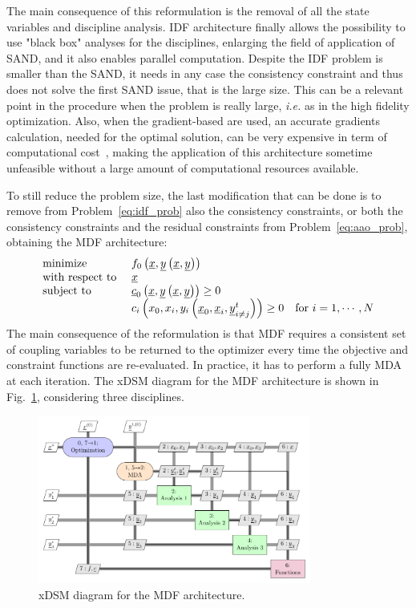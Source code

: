 The main consequence of this reformulation is the removal of all the state variables and discipline analysis. 
IDF architecture finally allows the possibility to use "black box" analyses for the disciplines, enlarging the field of application of SAND, and it also enables parallel computation. 
Despite the IDF problem is smaller than the SAND, it needs in any case the consistency constraint and thus does not solve the first SAND issue, that is the large size. 
This can be a relevant point in the procedure when the problem is really large, \textit{i.e.} as in the high fidelity optimization. 
Also, when the gradient-based are used, an accurate gradients calculation, needed for the optimal solution, can be very expensive in term of computational cost~\cite{bib:hwang_omdao}, making the application of this architecture sometime unfeasible without a large amount of computational resources available. 

To still reduce the problem size, the last modification that can be done is to remove from Problem~\eqref{eq:idf_prob} also the consistency constraints, or both the consistency constraints and the residual constraints from Problem~\eqref{eq:aao_prob}, obtaining the MDF architecture:
\begin{equation}
\label{eq:mdf_prob}
\begin{array}{l l l}
\textrm{minimize } & f_0\left(\underline{x},\underline{y}\left(\underline{x}, \underline{y}\right)\right) & \\
\textrm{with respect to } & \underline{x} & \\
\textrm{subject to } & \underline{c}_0\left(\underline{x}, \underline{y}\left(\underline{x}, \underline{y}\right)\right)\geq 0 & \\
& c_i\left(x_0, x_i, y_i\left(\underline{x}_0, \underline{x}_i, \underline{y}_{i\neq j}^t\right)\right) \geq 0 & \textrm{for } i=1,\cdots,N \\
\end{array}
\end{equation}
The main consequence of the reformulation is that MDF requires a consistent set of coupling variables to be returned to the optimizer every time the objective and constraint functions are re-evaluated. 
In practice, it has to perform a fully MDA at each iteration. 
The xDSM diagram for the MDF architecture is shown in Fig.~\ref{fig:mdf_arch}, considering three disciplines. 
\begin{figure}[!h]
	\centering
	\includegraphics[keepaspectratio, width=0.8\textwidth]{images/app_mdo/MDF}
	\caption{xDSM diagram for the MDF architecture.}
	\label{fig:mdf_arch}
\end{figure}

